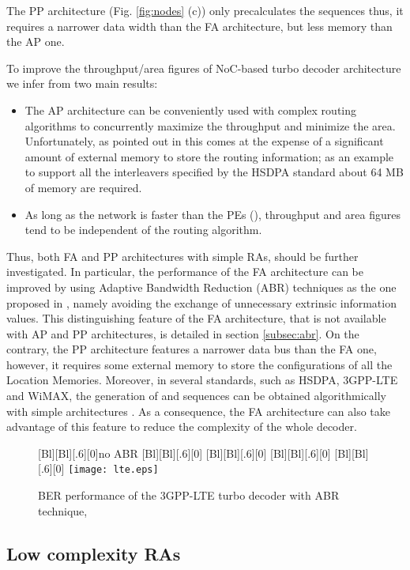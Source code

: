 \documentclass[10pt,twocolumn,journal]{IEEEtran}
\begin{document}
The PP architecture (Fig. \ref{fig:nodes} (c)) only precalculates the  sequences thus, it requires a narrower data width 
than the FA architecture, but less memory than the AP one.

To improve the throughput/area figures of NoC-based turbo decoder architecture we infer from
\cite{martina_TCASI10} two main results:
\begin{itemize}
\item The AP architecture can be conveniently used with complex routing 
algorithms to concurrently maximize the throughput and minimize the area. Unfortunately, as pointed out 
in \cite{martina_MPMS11} this comes at the expense of a significant amount of external memory 
to store the routing information; as an example to support all the interleavers specified by the HSDPA 
standard \cite{hsdpa} about 64 MB of memory are required. 
\item As long as the network is faster than the PEs (), throughput and area figures tend to be 
independent of the routing algorithm. 
\end{itemize}
Thus, both FA and PP architectures with simple RAs, should be further investigated. 
In particular, the performance of the FA architecture can be improved by using Adaptive Bandwidth Reduction (ABR) techniques 
as the one proposed in \cite{baghdadi_EL06}, namely avoiding the exchange of unnecessary extrinsic information values.
This distinguishing feature of the FA architecture, that is not available with AP and PP architectures, is detailed 
in section \ref{subsec:abr}.
On the contrary, the PP architecture features a narrower data bus than the FA one, however, it requires some external 
memory to store the configurations of all the Location Memories. 
Moreover, in several standards, such as HSDPA, 3GPP-LTE and WiMAX, the generation of  and  sequences 
can be obtained algorithmically with simple architectures \cite{kim_CICC09, wang_TCAS207, martina_CL08}. 
As a consequence, the FA architecture can also take advantage of this feature to reduce the complexity of the whole 
decoder.
\begin{figure}[t!]
  \centering
  [Bl][Bl][.6][0]{no ABR}
  [Bl][Bl][.6][0]{}
  [Bl][Bl][.6][0]{}
  [Bl][Bl][.6][0]{}
  [Bl][Bl][.6][0]{}
  \texttt{[image: lte.eps]}
\caption{BER performance of the 3GPP-LTE  turbo decoder with ABR technique, } 
\label{fig:lte}
\end{figure}

\subsection{Low complexity RAs}
\end{document}
